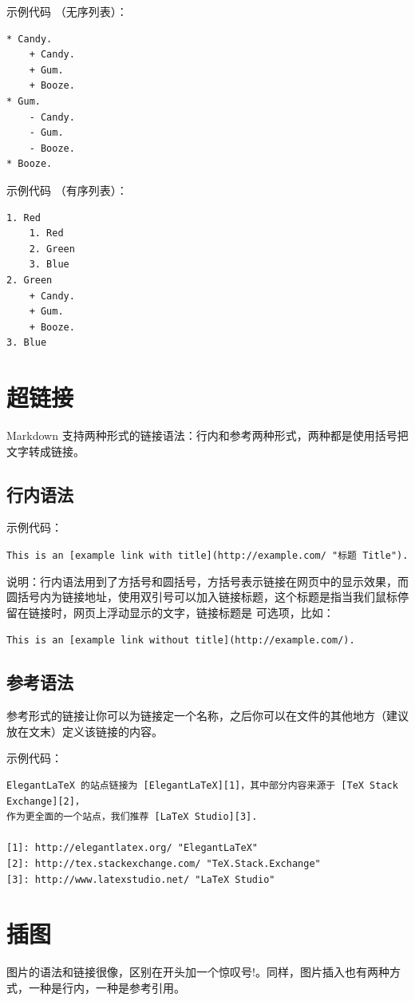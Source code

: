 示例代码 （无序列表）：
\begin{verbatim}
* Candy.
    + Candy.
    + Gum.
    + Booze.
* Gum.
    - Candy.
    - Gum.
    - Booze.
* Booze.
\end{verbatim}

示例代码 （有序列表）：
\begin{verbatim}
1. Red
    1. Red
    2. Green
    3. Blue
2. Green
    + Candy.
    + Gum.
    + Booze.
3. Blue
\end{verbatim}



\section{超链接}
Markdown 支持两种形式的链接语法：行内和参考两种形式，两种都是使用括号把文字转成链接。

\subsection{行内语法}
示例代码：

\verb|This is an [example link with title](http://example.com/ "标题 Title").|

说明：行内语法用到了方括号和圆括号，方括号表示链接在网页中的显示效果，而圆括号内为链接地址，使用双引号可以加入链接标题，这个标题是指当我们鼠标停留在链接时，网页上浮动显示的文字，链接标题是 可选项，比如：

\verb|This is an [example link without title](http://example.com/).|


\subsection{参考语法}
参考形式的链接让你可以为链接定一个名称，之后你可以在文件的其他地方（建议放在文末）定义该链接的内容。

示例代码：
\begin{verbatim}
ElegantLaTeX 的站点链接为 [ElegantLaTeX][1]，其中部分内容来源于 [TeX Stack Exchange][2]，
作为更全面的一个站点，我们推荐 [LaTeX Studio][3].

[1]: http://elegantlatex.org/ "ElegantLaTeX"
[2]: http://tex.stackexchange.com/ "TeX.Stack.Exchange"
[3]: http://www.latexstudio.net/ "LaTeX Studio"
\end{verbatim}


\section{插图}
图片的语法和链接很像，区别在开头加一个惊叹号!。同样，图片插入也有两种方式，一种是行内，一种是参考引用。


